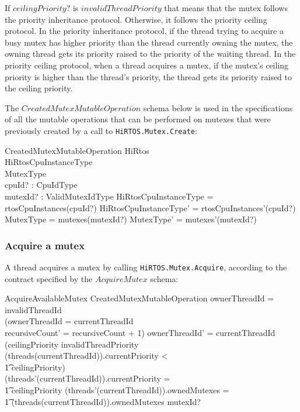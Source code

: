 \documentclass[11pt,letterpaper,twoside,openany]{book}
\begin{document}
If $ceilingPriority?$ is $invalidThreadPriority$ that means that the mutex follows the priority
inheritance protocol. Otherwise, it follows the priority ceiling protocol. In the priority inheritance
protocol, if the thread trying to acquire a busy mutex has higher priority than the thread currently
owning the mutex, the owning thread gets its priority raised to the priority of the waiting thread.
In the priority ceiling protocol, when a thread acquires a mutex, if the mutex's ceiling priority is
higher than the thread's priority, the thread gets its priority raised to the ceiling priority.

The $CreatedMutexMutableOperation$ schema below is used in the specifications of all the mutable
operations that can be performed on mutexes that were previously created by a call to
\verb'HiRTOS.Mutex.Create':

\begin{schema}{CreatedMutexMutableOperation}
   \Delta HiRtos \\
   \Delta HiRtosCpuInstanceType \\
   \Delta MutexType \\
   cpuId? : CpuIdType \\
   mutexId? : ValidMutexIdType
\where
   \theta HiRtosCpuInstanceType = rtosCpuInstances(cpuId?)
\also
   \theta HiRtosCpuInstanceType' = rtosCpuInstances'(cpuId?)
\also
   \theta MutexType = mutexes(mutexId?)
\also
   \theta MutexType' = mutexes'(mutexId?)
\end{schema}

\subsubsection{Acquire a mutex}

A thread acquires a mutex by calling \verb`HiRTOS.Mutex.Acquire`, according to the contract
specified by the $AcquireMutex$ schema:

\begin{schema}{AcquireAvailableMutex}
   CreatedMutexMutableOperation
\where
   ownerThreadId = invalidThreadId \lor \\
   (ownerThreadId = currentThreadId \implies \\
    recursiveCount' = recursiveCount + 1)
\also
   ownerThreadId' = currentThreadId
\also
(ceilingPriority \neq invalidThreadPriority \land \\
 (threads(currentThreadId)).currentPriority < \\
 \t1    ceilingPriority) \implies \\
 (threads'(currentThreadId)).currentPriority = \\
 \t1    ceilingPriority
\also
(threads'(currentThreadId)).ownedMutexes = \\
\t1 (threads(currentThreadId)).ownedMutexes \cat \langle mutexId? \rangle
\end{schema}
\end{document}
